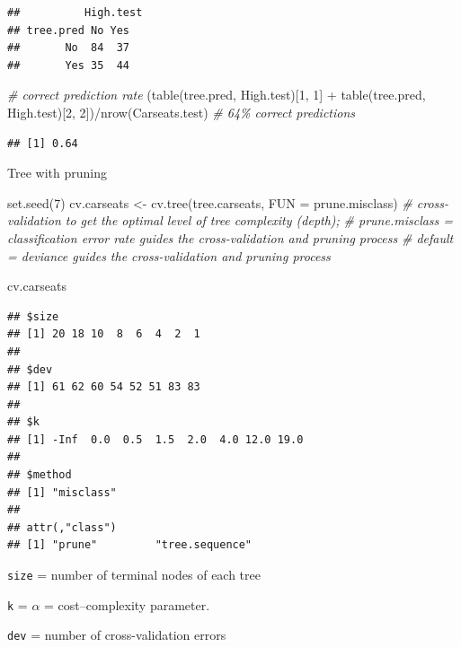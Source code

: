 \documentclass[
]{book}
\newenvironment{Shaded}{\begin{snugshade}}{\end{snugshade}}
\newcommand{\AttributeTok}[1]{\textcolor[rgb]{0.77,0.63,0.00}{#1}}
\newcommand{\CommentTok}[1]{\textcolor[rgb]{0.56,0.35,0.01}{\textit{#1}}}
\newcommand{\DecValTok}[1]{\textcolor[rgb]{0.00,0.00,0.81}{#1}}
\newcommand{\FunctionTok}[1]{\textcolor[rgb]{0.00,0.00,0.00}{#1}}
\newcommand{\NormalTok}[1]{#1}
\newcommand{\OtherTok}[1]{\textcolor[rgb]{0.56,0.35,0.01}{#1}}
\newcommand{\SpecialCharTok}[1]{\textcolor[rgb]{0.00,0.00,0.00}{#1}}
\begin{document}
\begin{verbatim}
##          High.test
## tree.pred No Yes
##       No  84  37
##       Yes 35  44
\end{verbatim}

\begin{Shaded}
\begin{Highlighting}[]
\CommentTok{\# correct prediction rate }
\NormalTok{(}\FunctionTok{table}\NormalTok{(tree.pred, High.test)[}\DecValTok{1}\NormalTok{, }\DecValTok{1}\NormalTok{] }\SpecialCharTok{+} \FunctionTok{table}\NormalTok{(tree.pred, High.test)[}\DecValTok{2}\NormalTok{, }\DecValTok{2}\NormalTok{])}\SpecialCharTok{/}\FunctionTok{nrow}\NormalTok{(Carseats.test) }\CommentTok{\# 64\% correct predictions}
\end{Highlighting}
\end{Shaded}

\begin{verbatim}
## [1] 0.64
\end{verbatim}

Tree with pruning

\begin{Shaded}
\begin{Highlighting}[]
\FunctionTok{set.seed}\NormalTok{(}\DecValTok{7}\NormalTok{)}
\NormalTok{cv.carseats }\OtherTok{\textless{}{-}} \FunctionTok{cv.tree}\NormalTok{(tree.carseats, }\AttributeTok{FUN =}\NormalTok{ prune.misclass) }\CommentTok{\# cross{-}validation to get the optimal level of tree complexity (depth); }
\CommentTok{\# prune.misclass = classification error rate guides the cross{-}validation and pruning process}
\CommentTok{\# default = deviance guides the cross{-}validation and pruning process}

\NormalTok{cv.carseats}
\end{Highlighting}
\end{Shaded}

\begin{verbatim}
## $size
## [1] 20 18 10  8  6  4  2  1
## 
## $dev
## [1] 61 62 60 54 52 51 83 83
## 
## $k
## [1] -Inf  0.0  0.5  1.5  2.0  4.0 12.0 19.0
## 
## $method
## [1] "misclass"
## 
## attr(,"class")
## [1] "prune"         "tree.sequence"
\end{verbatim}

\texttt{size} = number of terminal nodes of each tree

\texttt{k} = \(\alpha\) = cost--complexity parameter.

\texttt{dev} = number of cross-validation errors
\end{document}

